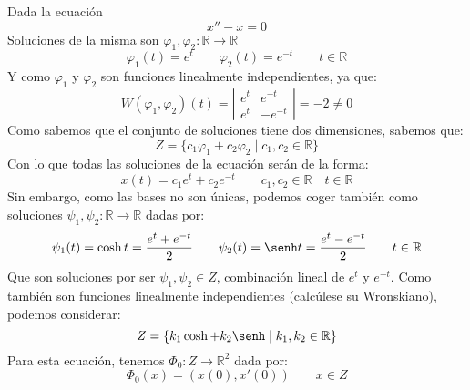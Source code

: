 \begin{ejemplo}
    Dada la ecuación
    \begin{equation*}
        x'' - x = 0
    \end{equation*}
    Soluciones de la misma son $\varphi_1,\varphi_2:\mathbb{R}\rightarrow\mathbb{R}$
    \begin{equation*}
        \varphi_1(t) = e^t \qquad \varphi_2(t) = e^{-t} \qquad t\in \mathbb{R}
    \end{equation*}
    Y como $\varphi_1$ y $\varphi_2$ son funciones linealmente independientes, ya que:
    \begin{equation*}
        W(\varphi_1,\varphi_2)(t) = \left|\begin{array}{cc}
            e^t & e^{-t} \\
            e^t & -e^{-t} 
        \end{array}\right| = -2  \neq 0
    \end{equation*}
    Como sabemos que el conjunto de soluciones tiene dos dimensiones, sabemos que:
    \begin{equation*}
        Z = \{c_1 \varphi_1 + c_2 \varphi_2 \mid c_1,c_2 \in \mathbb{R}\}
    \end{equation*}
    Con lo que todas las soluciones de la ecuación serán de la forma:
    \begin{equation*}
        x(t) = c_1 e^t + c_2 e^{-t} \qquad c_1,c_2\in \mathbb{R} \quad t\in \mathbb{R}
    \end{equation*}
    Sin embargo, como las bases no son únicas, podemos coger también como soluciones $\psi_1,\psi_2:\mathbb{R}\rightarrow\mathbb{R}$ dadas por:
    \begin{equation*}
        \psi_1(t) = \cosh t = \dfrac{e^t + e^{-t}}{2} \qquad \psi_2(t) = \senh t = \dfrac{e^t - e^{-t}}{2} \qquad t\in \mathbb{R}
    \end{equation*}
    Que son soluciones por ser $\psi_1,\psi_2\in Z$, combinación lineal de $e^t$ y $e^{-t}$. Como también son funciones linealmente independientes (calcúlese su Wronskiano), podemos considerar:
    \begin{equation*}
        Z = \{k_1 \cosh  + k_2 \senh  \mid k_1,k_2 \in \mathbb{R}\}
    \end{equation*}
    Para esta ecuación, tenemos $\Phi_{0}:Z\rightarrow\mathbb{R}^2$ dada por:
    \begin{equation*}
        \Phi_0(x) = (x(0), x'(0)) \qquad x\in Z
    \end{equation*}


\end{ejemplo}
